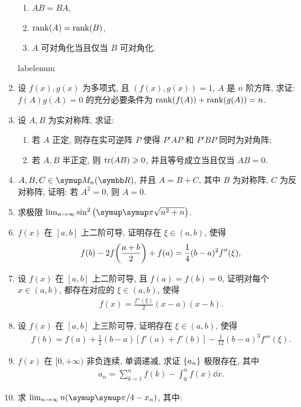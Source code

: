 \documentclass{ctexart}
\makeatletter
\let\umathpi\pi
\renewcommand\pi{\symup\umathpi}%
\let\set\qty
\let\ge\geqslant
\def\asteriskitem{*}
\def\sitem{%
  \expandafter\let\expandafter\originallabel\csname labelenum\romannumeral\@enumdepth\endcsname
  \expandafter\def\csname labelenum\romannumeral\@enumdepth\expandafter\endcsname\expandafter{%
    \expandafter\bfseries\expandafter\color{red}\expandafter{\expandafter\asteriskitem\expandafter\originallabel}}%
  \item
  \expandafter\let\csname labelenum\romannumeral\@enumdepth\endcsname\originallabel
}
\newcommand{\limit}[2]{\lim_{#1 \to #2}}
\makeatother
\begin{document}
\begin{enumerate}[series=exer]
    \begin{enumerate}
        \item $ AB = BA $,
        \item $ \rank(A) = \rank(B) $,
        \item $ A $ 可对角化当且仅当 $ B $ 可对角化.
    \end{enumerate}
    \sitem 设 $ f(x), g(x) $ 为多项式, 且 $ (f(x), g(x)) = 1 $, $ A $ 是 $ n $ 阶方阵, 求证: $ f(A)g(A) = 0 $ 的充分必要条件为 $ \rank(f(A)) + \rank(g(A)) = n $.
    \item 设 $ A, B $ 为实对称阵, 求证:
    \begin{enumerate}
        \item 若 $ A $ 正定, 则存在实可逆阵 $ P $ 使得 $ P'AP $ 和 $ P'BP $ 同时为对角阵;
        \item 若 $ A, B $ 半正定, 则 $ \tr(AB) \ge 0 $, 并且等号成立当且仅当 $ AB = 0 $.
    \end{enumerate}
    \item $ A, B, C \in \MM $, 并且 $ A = B + C $, 其中 $ B $ 为对称阵, $ C $ 为反对称阵, 证明: 若 $ A^{2} = 0 $, 则 $ A = 0 $.
    \item 求极限 $ \limit{n}{\infty} \sin^{2}\qty(\pi \sqrt{n^{2} + n}) $.  
    \item $ f(x) $ 在 $ [a, b] $ 上二阶可导, 证明存在 $ \xi \in (a, b) $, 使得
    \begin{align*}
        f(b) - 2f\qty(\frac{a + b}{2}) + f(a) = \frac{1}{4} (b - a)^{2} f''(\xi),
    \end{align*}
    \item 设 $ f(x) $ 在 $ [a, b] $ 上二阶可导, 且 $ f(a) = f(b)  = 0 $, 证明对每个 $ x \in (a, b) $, 都存在对应的 $ \xi \in (a, b) $, 使得
    \begin{align*}
        f(x) = \frac{f''(\xi)}{2} (x - a) (x - b).
    \end{align*}
    \item 设 $ f(x) $ 在 $ [a, b] $ 上三阶可导, 证明存在 $ \xi \in (a, b) $, 使得
    \begin{align*}
        f(b) = f(a) + \frac{1}{2} (b - a) [f'(a) + f'(b)] - \frac{1}{12} (b - a)^{3} f'''(\xi).
    \end{align*}
    \item $ f(x) $ 在 $ [0, +\infty) $ 非负连续, 单调递减, 求证 $ \set{a_{n}} $ 极限存在, 其中
    \begin{align*}
        a_{n} = \sum_{k = 1}^{n} f(k) - \int_{0}^{n} f(x) \dd{x}.
    \end{align*}
    \item 求 $ \limit{n}{\infty} n \qty(\pi/4 - x_{n}) $, 其中:

\end{enumerate}
\end{document}
